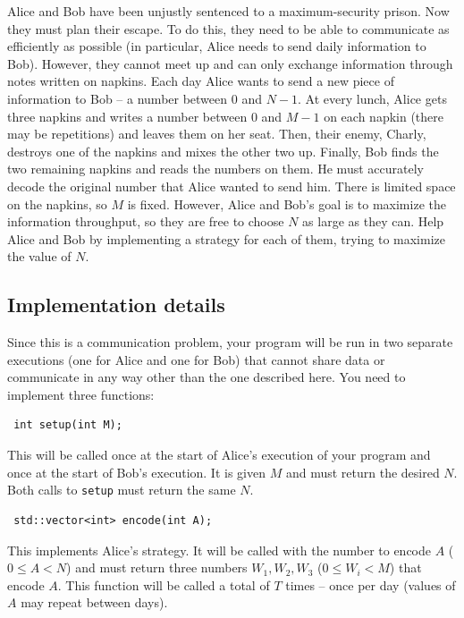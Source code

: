 \documentclass[12pt]{article}
\begin{document}
\renewcommand{\round}{Day 1}
\renewcommand{\problemName}{Task Prison}
\renewcommand{\lang}{English}

\renewcommand{\tl}{$2$ sec.}
\renewcommand{\ml}{$1024$ MB}
\problem{\problemName}

Alice and Bob have been unjustly sentenced to a maximum-security prison. Now they must plan their escape. To do this, they need to be able to communicate as efficiently as possible (in particular, Alice needs to send daily information to Bob). However, they cannot meet up and can only exchange information through notes written on napkins. Each day Alice wants to send a new piece of information to Bob -- a number between $0$ and $N-1$. At every lunch, Alice gets three napkins and writes a number between $0$ and $M-1$ on each napkin (there may be repetitions) and leaves them on her seat. Then, their enemy, Charly, destroys one of the napkins and mixes the other two up. Finally, Bob finds the two remaining napkins and reads the numbers on them. He must accurately decode the original number that Alice wanted to send him. There is limited space on the napkins, so $M$ is fixed. However, Alice and Bob's goal is to maximize the information throughput, so they are free to choose $N$ as large as they can. Help Alice and Bob by implementing a strategy for each of them, trying to maximize the value of $N$.

\subsection{Implementation details}
Since this is a communication problem, your program will be run in two separate executions (one for Alice and one for Bob) that cannot share data or communicate in any way other than the one described here. You need to implement three functions:

\begin{lstlisting}
 int setup(int M);
\end{lstlisting}

This will be called once at the start of Alice's execution of your program and once at the start of Bob's execution. It is given $M$ and must return the desired $N$. Both calls to \texttt{setup} must return the same $N$.

\begin{lstlisting}
 std::vector<int> encode(int A);
\end{lstlisting}

This implements Alice's strategy. It will be called with the number to encode $A$ ($0 \leq A < N$) and must return three numbers $W_1, W_2, W_3$ ($0 \leq W_i < M$) that encode $A$. This function will be called a total of $T$ times -- once per day (values of $A$ may repeat between days).
\end{document}
